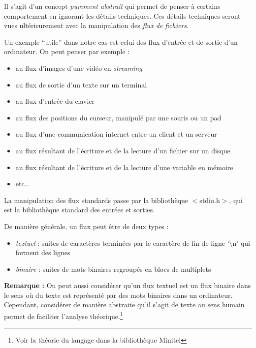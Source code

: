 \documentclass[../../../main.tex]{subfiles}
\begin{document}
 
Il s'agit d'un concept \textit{purement abstrait} qui permet de penser à certains comportement en ignorant les détails techniques. Ces détails techniques seront vues ultérieurement avec la manipulation des \textit{flux de fichiers}.
 
Un exemple ``utile'' dans notre cas est celui des flux d'entrée et de sortie d'un ordinateur. On peut penser par exemple :
\begin{itemize}
	\item au flux d'images d'une vidéo en \textit{streaming}
	\item au flux de sortie d'un texte sur un terminal
	\item au flux d'entrée du clavier
	\item au flux des positions du curseur, manipulé par une souris ou un pad
	\item au flux d'une communication internet entre un client et un serveur
	\item au flux résultant de l'écriture et de la lecture d'un fichier sur un disque
	\item au flux résultant de l'écriture et de la lecture d'une variable en mémoire
	\item etc\dots
\end{itemize}
La manipulation des flux standards passe par la bibliothèque \textsf{$<$stdio.h$>$}, qui est la bibliothèque standard des entrées et sorties.
 
De manière générale, un flux peut être de deux types :
\begin{itemize}
	\item \textit{textuel} : suites de caractères terminées par le caractère de fin de ligne `\textsf{$\setminus$n}' qui forment des lignes
	\item \textit{binaire} : suites de mots binaires regroupés en blocs de multiplets
\end{itemize}
\textbf{Remarque :} On peut aussi considérer qu'un flux textuel est un flux binaire dans le sens où du texte est représenté par des mots binaires dans un ordinateur. Cependant, considérer de manière abstraite qu'il s'agit de texte au sens humain permet de faciliter l'analyse théorique.\footnote{Voir la théorie du langage dans la bibliothèque Minitel}
 
\end{document}
